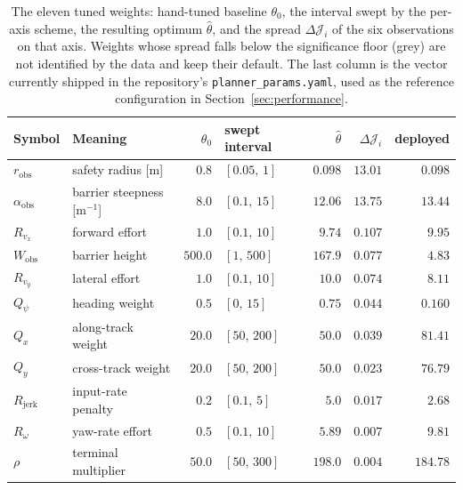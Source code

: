 \documentclass[11pt,a4paper]{article}
\newcommand{\Wobs}{W_{\mathrm{obs}}}
\newcommand{\aobs}{\alpha_{\mathrm{obs}}}
\newcommand{\robs}{r_{\mathrm{obs}}}
\newcommand{\Rjerk}{R_{\mathrm{jerk}}}
\newcommand{\thn}{\theta_0}
\begin{document}
\begin{table}[htbp]
  \centering
  \small
  \caption{The eleven tuned weights: hand-tuned baseline $\thn$, the interval swept by the per-axis scheme,
  the resulting optimum $\hat\theta$, and the spread $\Delta\mathcal{J}_i$ of the six observations on that
  axis. Weights whose spread falls below the significance floor (grey) are not identified by the data and keep
  their default. The last column is the vector currently shipped in the repository's
  \texttt{planner\_params.yaml}, used as the reference configuration in Section~\ref{sec:performance}.}
  \label{tab:params}
  \setlength{\tabcolsep}{5pt}
  \begin{tabular}{llrlrrr}
    \toprule
    Symbol & Meaning & $\thn$ & swept interval & $\hat\theta$ & $\Delta\mathcal{J}_i$ & deployed \\
    \midrule
    $\robs$    & safety radius [m]            & $0.8$   & $[0.05,\,1]$  & $0.098$  & $\mathbf{13.01}$ & $0.098$ \\
    $\aobs$    & barrier steepness [m$^{-1}$] & $8.0$   & $[0.1,\,15]$  & $12.06$  & $\mathbf{13.75}$ & $13.44$ \\
    $R_{v_x}$  & forward effort               & $1.0$   & $[0.1,\,10]$  & $9.74$   & $0.107$ & $9.95$ \\
    $\Wobs$    & barrier height               & $500.0$ & $[1,\,500]$   & $167.9$  & $0.077$ & $4.83$ \\
    $R_{v_y}$  & lateral effort               & $1.0$   & $[0.1,\,10]$  & $10.0$   & $0.074$ & $8.11$ \\
    \midrule
    \rowcolor{black!6} $Q_\psi$   & heading weight    & $0.5$   & $[0,\,15]$   & $0.75$  & $0.044$ & $0.160$ \\
    \rowcolor{black!6} $Q_x$      & along-track weight& $20.0$  & $[50,\,200]$ & $50.0$  & $0.039$ & $81.41$ \\
    \rowcolor{black!6} $Q_y$      & cross-track weight& $20.0$  & $[50,\,200]$ & $50.0$  & $0.023$ & $76.79$ \\
    \rowcolor{black!6} $\Rjerk$   & input-rate penalty& $0.2$   & $[0.1,\,5]$  & $5.0$   & $0.017$ & $2.68$ \\
    \rowcolor{black!6} $R_\omega$ & yaw-rate effort   & $0.5$   & $[0.1,\,10]$ & $5.89$  & $0.007$ & $9.81$ \\
    \rowcolor{black!6} $\rho$     & terminal multiplier& $50.0$ & $[50,\,300]$ & $198.0$ & $0.004$ & $184.78$ \\
    \bottomrule
  \end{tabular}
\end{table}
\end{document}
